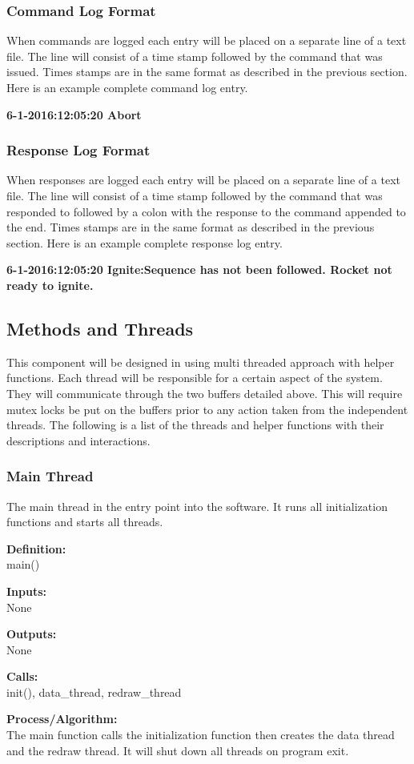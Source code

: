 \documentclass[10pt,draftclsnofoot,onecolumn,compsoc]{IEEEtran}
\begin{document}
\subsubsection{Command Log Format}
When commands are logged each entry will be placed on a separate line of a text file. The line will consist of a time stamp followed by the command that was issued. Times stamps are in the same format as described in the previous section. Here is an example complete command log entry.\par
{\bf  6-1-2016:12:05:20 Abort}\par

\subsubsection{Response Log Format}
When responses are logged each entry will be placed on a separate line of a text file. The line will consist of a time stamp followed by the command that was responded to followed by a colon with the response to the command appended to the end. Times stamps are in the same format as described in the previous section. Here is an example complete response log entry.\par
{\bf  6-1-2016:12:05:20 Ignite:Sequence has not been followed. Rocket not ready to ignite.}\par

\subsection{Methods and Threads}
This component will be designed in using multi threaded approach with helper functions. Each thread will be responsible for a certain aspect of the system. They will communicate through the two buffers detailed above. This will require mutex locks be put on the buffers prior to any action taken from the independent threads. The following is a list of the threads and helper functions with their descriptions and interactions.
\subsubsection{Main Thread}
The main thread in the entry point into the software. It runs all initialization functions and starts all threads. \par
{\bf Definition:} \\ 
main() \par
{\bf Inputs:} \\  None \par
{\bf Outputs:} \\ None \par
{\bf Calls:} \\ init(), data\_thread, redraw\_thread \par
{\bf Process/Algorithm:} \\
The main function calls the initialization function then creates the data thread and the redraw thread. It will shut down all threads on program exit. \par
\end{document}
